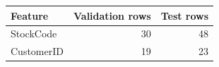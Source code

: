 \begin{tabular}{lrr}
\toprule
Feature & Validation rows & Test rows \\
\midrule
StockCode & 30 & 48 \\
CustomerID & 19 & 23 \\
\bottomrule
\end{tabular}
